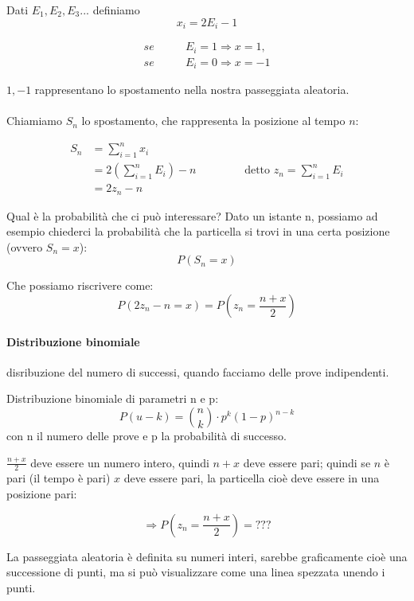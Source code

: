 \documentclass[a4paper,12pt]{book}
\newcommand\ddfrac[2]{\frac{\displaystyle #1}{\displaystyle #2}}
\begin{document}
Dati $ E_1, E_2, E_3... $ definiamo
$$x_i = 2E_i - 1$$

\begin{align*}
	se \qquad & E_i = 1 \Rightarrow x=1, \\
	se \qquad & E_i = 0 \Rightarrow x=-1
\end{align*}

$ 1, -1 $ rappresentano lo spostamento nella nostra passeggiata aleatoria. 
\\
\\
Chiamiamo $ S_n $ lo spostamento, che rappresenta la posizione al tempo $ n $:
\begin{center}
\begin{align*}
	S_n & = \sum_{i=1}^{n} x_i \\
	& = 2(\sum_{i=1}^{n}E_i)-n \qquad \qquad \text{ detto } z_n = \sum_{i=1}^{n} E_i \\
	& = 2z_n - n
\end{align*}
\end{center}

Qual è la probabilità che ci può interessare? Dato un istante n, possiamo ad esempio chiederci la probabilità che la particella si trovi in una certa posizione (ovvero $ S_n = x $):
$$ P(S_n = x) $$

Che possiamo riscrivere come:
$$ P(2z_n - n = x) = P(z_n = \frac{n+x}{2})$$


\begin{tcolorbox}
	\paragraph{Distribuzione binomiale} disribuzione del numero di successi, quando facciamo delle prove indipendenti. 
	
	Distribuzione binomiale di parametri n e p:
	$$P(u - k) = \binom{n}{k} \cdot p^k(1-p)^{n-k}$$
	con n il numero delle prove e p la probabilità di successo. 
\end{tcolorbox}


$\ddfrac{n+x}{2}$ deve essere un numero intero, quindi $ n+x $ deve essere pari; quindi se $ n $ è pari (il tempo è pari) $ x $ deve essere pari, la particella cioè deve essere in una posizione pari:

$$\Rightarrow P(z_n = \frac{n+x}{2}) = ???$$

La passeggiata aleatoria è definita su numeri interi, sarebbe graficamente cioè una successione di punti, ma si può visualizzare come una linea spezzata unendo i punti. 
\end{document}
